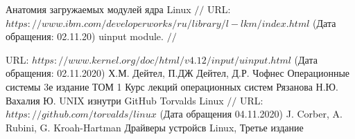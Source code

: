 \makeatletter \renewcommand{} \makeatother
\renewcommand\refname{Список использованных источников}
\begin{thebibliography}{00}
	
	Анатомия загружаемых модулей ядра Linux $//$ URL: $https://www.ibm.com/developerworks/ru/library/l-lkm/index.html$ (Дата обращения: 02.11.20)
	uinput module. $//$ 
	
	URL: $https://www.kernel.org/doc/html/v4.12/input/uinput.html$ (Дата обращения: 02.11.2020)
	Х.М. Дейтел, П.ДЖ Дейтел, Д.Р. Чофнес Операционные системы 3е издание ТОМ 1
	Курс лекций операционных систем Рязанова Н.Ю.
	Вахалия Ю. UNIX изнутри 
	GitHub Torvalds Linux $//$ URL: $https://github.com/torvalds/linux$ (Дата обращения 04.11.2020)
	J. Corber, A. Rubini, G. Kroah-Hartman Драйверы устройсв Linux, Третье издание

\end{thebibliography}

